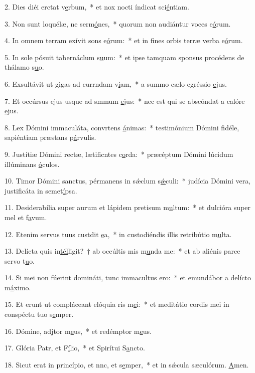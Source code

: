 2. Dies diéi erctat v\uline{e}rbum,~* et nox nocti índicat sci\uline{é}ntiam.\par 
3. Non sunt loquélæ, ne serm\uline{ó}nes,~* quorum non audiántur voces e\uline{ó}rum.\par 
4. In omnem terram exívit sons e\uline{ó}rum:~* et in fines orbis terræ verba e\uline{ó}rum.\par 
5. In sole pósuit tabernáclum s\uline{u}um:~* et ipse tamquam sponsus procédens de thálamo s\uline{u}o.\par 
6. Exsultávit ut gigas ad currndam v\uline{i}am,~* a summo cælo egréssio \uline{e}jus.\par 
7. Et occúrsus ejus usque ad smmum \uline{e}jus:~* nec est qui se abscóndat a calóre \uline{e}jus.\par 
8. Lex Dómini immaculáta, convrtens \uline{á}nimas:~* testimónium Dómini fidéle, sapiéntiam præstans p\uline{á}rvulis.\par 
9. Justítiæ Dómini rectæ, lætificntes c\uline{o}rda:~* præcéptum Dómini lúcidum illúminans \uline{ó}culos.\par 
10. Timor Dómini sanctus, pérmanens in sǽclum s\uline{ǽ}culi:~* judícia Dómini vera, justificáta in semet\uline{í}psa.\par 
11. Desiderabília super aurum et lápidem pretisum m\uline{u}ltum:~* et dulcióra super mel et f\uline{a}vum.\par 
12. Etenim servus tuus custdit \uline{e}a,~* in custodiéndis illis retribútio m\uline{u}lta.\par 
13. Delícta quis in\uline{tél}ligit?~† ab occúltis mis m\uline{u}nda me:~* et ab aliénis parce servo t\uline{u}o.\par 
14. Si mei non fúerint domináti, tunc immacultus \uline{e}ro:~* et emundábor a delícto m\uline{á}ximo.\par 
15. Et erunt ut compláceant elóquia ris m\uline{e}i:~* et meditátio cordis mei in conspéctu tuo s\uline{e}mper.\par 
16. Dómine, adjtor m\uline{e}us,~* et redémptor m\uline{e}us.\par 
17. Glória Patr, et F\uline{í}lio,~* et Spirítui S\uline{a}ncto.\par 
18. Sicut erat in princípio, et nnc, et s\uline{e}mper,~* et in sǽcula sæculórum. \uline{A}men.\par 
